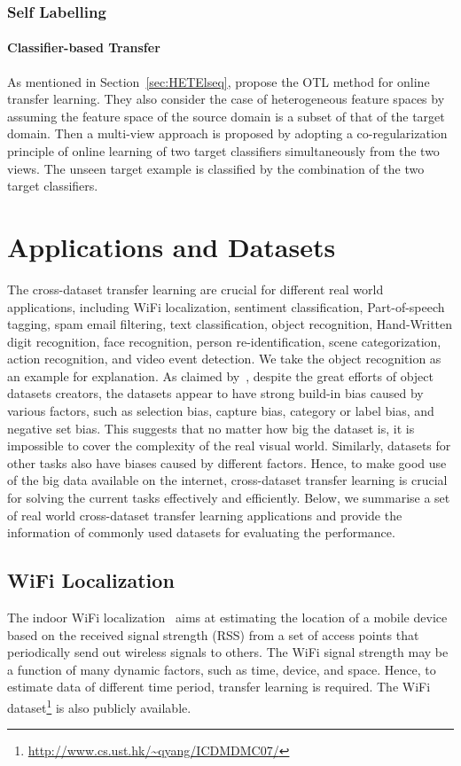 \documentclass[prodmode]{acmsmall}  %
\begin{document}
\subsubsection{Self Labelling}
\paragraph{Classifier-based Transfer} As mentioned in Section~\ref{sec:HETElseq},  propose the OTL method for online transfer learning. They also consider the case of heterogeneous feature spaces by assuming the feature space of the source domain is a subset of that of the target domain. Then a multi-view approach is proposed by adopting a co-regularization principle of online learning of two target classifiers simultaneously from the two views. The unseen target example is classified by the combination of the two target classifiers.

\section{Applications and Datasets}
\label{sec:App}
The cross-dataset transfer learning are crucial for different real world applications, including WiFi localization, sentiment classification, Part-of-speech tagging, spam email filtering, text classification, object recognition, Hand-Written digit recognition, face recognition, person re-identification, scene categorization, action recognition, and video event detection. We take the object recognition as an example for explanation. As claimed by~, despite the great efforts of object datasets creators, the datasets appear to have strong build-in bias caused by various factors, such as selection bias, capture bias, category or label bias, and negative set bias. This suggests that no matter how big the dataset is, it is impossible to cover the complexity of the real visual world. Similarly, datasets for other tasks also have biases caused by different factors. Hence, to make good use of the big data available on the internet, cross-dataset transfer learning is crucial for solving the current tasks effectively and efficiently. Below, we summarise a set of real world cross-dataset transfer learning applications and provide the information of commonly used datasets for evaluating the performance.
\subsection{WiFi Localization}
The indoor WiFi localization~\cite{Yang2008} aims at estimating the location of a mobile device based on the received signal strength (RSS) from a set of access points that periodically send out wireless signals to others. The WiFi signal strength may be a function of many dynamic factors, such as time, device, and space. Hence, to estimate data of different time period, transfer learning is required. The WiFi dataset\footnote{\url{http://www.cs.ust.hk/~qyang/ICDMDMC07/}} is also publicly available. 
\end{document}
